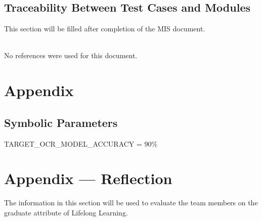 \documentclass[12pt, titlepage]{article}
\begin{document}


\subsection{Traceability Between Test Cases and Modules}

This section will be filled after completion of the MIS document.


\newpage





\noindent
\\No references were used for this document.

\newpage

\section{Appendix}

\subsection{Symbolic Parameters}

TARGET\_OCR\_MODEL\_ACCURACY = 90\%



\newpage{}
\section*{Appendix --- Reflection}


The information in this section will be used to evaluate the team members on the
graduate attribute of Lifelong Learning.


\end{document}
